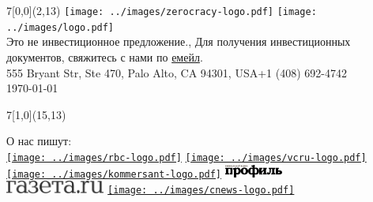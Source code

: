 \documentclass{deck}
\begin{document}
\setlength{\parindent}{0pt} %

\setlength{\fboxsep}{2pt}
\newcommand\point[2]{\vbox{\raggedright\small%
  \fcolorbox{zgreen}{white}{\color{zgreen}#1}\newline%
  \footnotesize#2\vspace{16pt}}}
\newcommand\highlight[1]{\colorbox{zgreen}{\color{white}\thinspace{#1}\thinspace}}

\begin{textblock}{7}[0,0](2,13){
  \color{gray}\footnotesize
  \texttt{[image: ../images/zerocracy-logo.pdf]}
  \texttt{[image: ../images/logo.pdf]}\\
  Это не инвестиционное предложение.,
  Для получения инвестиционных \\
  документов, свяжитесь с нами по \href{mailto:cio@zerocracy.com}{емейл}.\\
  555 Bryant Str, Ste 470, Palo Alto, CA 94301, USA\quad+1 (408) 692-4742\\
  \today\quad\zoldversion
}\end{textblock}

\begin{textblock}{7}[1,0](15,13){\begin{flushright}
  \color{gray}\footnotesize
  О нас пишут:\\[4pt]
  \href{https://www.rbc.ru/crypto/news/5c0f98a79a79479329c12358}{\texttt{[image: ../images/rbc-logo.pdf]}}
  \quad
  \href{https://vc.ru/life/53597-pochemu-proekty-pod-upravleniem-robota-v-3-raza-rentabelnee}{\texttt{[image: ../images/vcru-logo.pdf]}}
  \quad
  \href{https://www.kommersant.ru/doc/3811862}{\texttt{[image: ../images/kommersant-logo.pdf]}}
  \quad
  \href{https://profile.ru/scitech/doveryaya-svoyu-sudbu-iskusstvennomu-intellektu-chelovechestvo-silno-riskuet-67048/}{\includegraphics[height=12pt]{../images/profil-logo.png}}
  \\[4pt]
  \href{https://www.gazeta.ru/tech/2019/06/24/12438451/libra\_frightens.shtml}{\includegraphics[height=12pt]{../images/gazeta-logo.pdf}}
  \quad
  \href{http://www.cnews.ru/news/line/2018-12-05_zerocracy_zapustila_kriptovalyutu_zold_dlya_mikroplatezhej}{\texttt{[image: ../images/cnews-logo.pdf]}}
\end{flushright}}\end{textblock}
\end{document}
